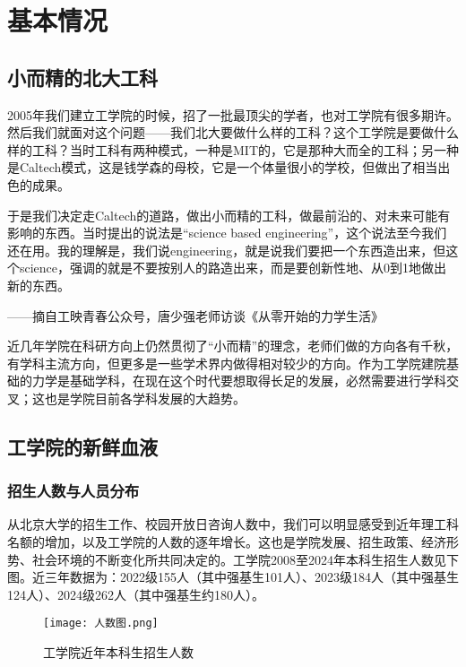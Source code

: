 \documentclass[11pt,oneside]{book}
\begin{document}
\tableofcontents

\mainmatter

\chapter{基本情况}
\section{小而精的北大工科}
2005年我们建立工学院的时候，招了一批最顶尖的学者，也对工学院有很多期许。然后我们就面对这个问题——我们北大要做什么样的工科？这个工学院是要做什么样的工科？当时工科有两种模式，一种是MIT的，它是那种大而全的工科；另一种是Caltech模式，这是钱学森的母校，它是一个体量很小的学校，但做出了相当出色的成果。

于是我们决定走Caltech的道路，做出小而精的工科，做最前沿的、对未来可能有影响的东西。当时提出的说法是“science based engineering”，这个说法至今我们还在用。我的理解是，我们说engineering，就是说我们要把一个东西造出来，但这个science，强调的就是不要按别人的路造出来，而是要创新性地、从0到1地做出新的东西。
\begin{flushright}
    ——摘自工映青春公众号，唐少强老师访谈《从零开始的力学生活》

\end{flushright}

\vspace{10pt}

近几年学院在科研方向上仍然贯彻了“小而精”的理念，老师们做的方向各有千秋，有学科主流方向，但更多是一些学术界内做得相对较少的方向。作为工学院建院基础的力学是基础学科，在现在这个时代要想取得长足的发展，必然需要进行学科交叉；这也是学院目前各学科发展的大趋势。

\section{工学院的新鲜血液}    
\subsection{招生人数与人员分布}
从北京大学的招生工作、校园开放日咨询人数中，我们可以明显感受到近年理工科名额的增加，以及工学院的人数的逐年增长。这也是学院发展、招生政策、经济形势、社会环境的不断变化所共同决定的。工学院2008至2024年本科生招生人数见下图。近三年数据为：2022级155人（其中强基生101人）、2023级184人（其中强基生124人）、2024级262人（其中强基生约180人）。

\begin{figure}[H]
    \centering
    \texttt{[image: 人数图.png]} %
    \renewcommand{\figurename}{图}
    \caption{工学院近年本科生招生人数}
    \label{fig:enter-label}
\end{figure}
        
\end{document}
